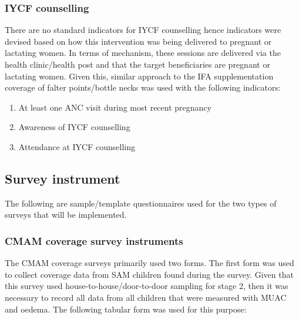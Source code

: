 \documentclass[12pt,a4paper]{article}
\begin{document}
\hypertarget{iycf-counselling}{%
\subsubsection{IYCF counselling}\label{iycf-counselling}}

There are no standard indicators for IYCF counselling hence indicators were devised based on how this intervention was being delivered to pregnant or lactating women. In terms of mechanism, these sessions are delivered via the health clinic/health post and that the target beneficiaries are pregnant or lactating women. Given this, similar approach to the IFA supplementation coverage of falter points/bottle necks was used with the following indicators:

\begin{enumerate}
\def\labelenumi{\arabic{enumi}.}
\item
  At least one ANC visit during most recent pregnancy
\item
  Awareness of IYCF counselling
\item
  Attendance at IYCF counselling
\end{enumerate}

\newpage

\hypertarget{survey-instrument}{%
\subsection{Survey instrument}\label{survey-instrument}}

The following are sample/template questionnaires used for the two types of surveys that will be implemented.

\hypertarget{cmam-coverage-survey-instruments}{%
\subsubsection{CMAM coverage survey instruments}\label{cmam-coverage-survey-instruments}}

The CMAM coverage surveys primarily used two forms. The first form was used to collect coverage data from SAM children found during the survey. Given that this survey used house-to-house/door-to-door sampling for stage 2, then it was necessary to record all data from all children that were measured with MUAC and oedema. The following tabular form was used for this purpose:
\end{document}
